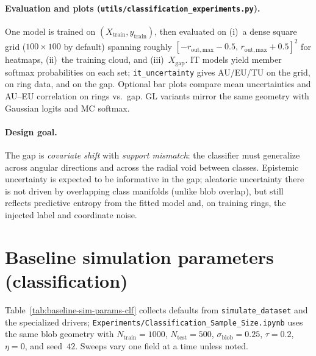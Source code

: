 \paragraph{Evaluation and plots (\texttt{utils/classification\_experiments.py}).}
One model is trained on $(X_{\mathrm{train}},y_{\mathrm{train}})$, then evaluated on (i)~a dense square grid ($100\times 100$ by default) spanning roughly $[-r_{\mathrm{out,max}}-0.5,\,r_{\mathrm{out,max}}+0.5]^2$ for heatmaps, (ii)~the training cloud, and (iii)~$X_{\mathrm{gap}}$. IT models yield member softmax probabilities on each set; \texttt{it\_uncertainty} gives AU/EU/TU on the grid, on ring data, and on the gap. Optional bar plots compare mean uncertainties and AU--EU correlation on rings vs.\ gap. GL variants mirror the same geometry with Gaussian logits and MC softmax.

\paragraph{Design goal.}
The gap is \emph{covariate shift} with \emph{support mismatch}: the classifier must generalize across angular directions and across the radial void between classes. Epistemic uncertainty is expected to be informative in the gap; aleatoric uncertainty there is not driven by overlapping class manifolds (unlike blob overlap), but still reflects predictive entropy from the fitted model and, on training rings, the injected label and coordinate noise.

\section{Baseline simulation parameters (classification)}
\label{sec:baseline-sim-params-clf}

Table~\ref{tab:baseline-sim-params-clf} collects defaults from \texttt{simulate\_dataset} and the specialized drivers; \texttt{Experiments/Classification\_Sample\_Size.ipynb} uses the same blob geometry with $N_{\mathrm{train}}=1000$, $N_{\mathrm{test}}=500$, $\sigma_{\mathrm{blob}}=0.25$, $\tau=0.2$, $\eta=0$, and seed~$42$. Sweeps vary one field at a time unless noted.

